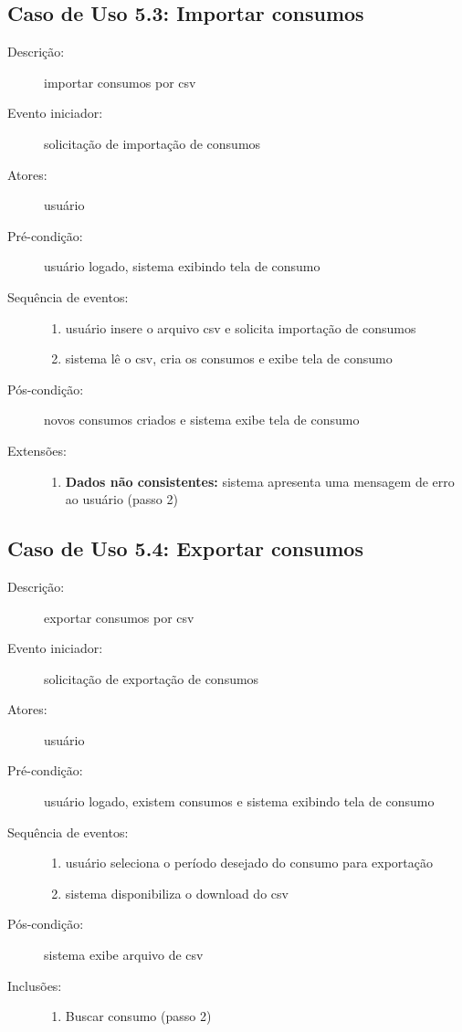 \subsection{Caso de Uso 5.3: Importar consumos}
\begin{description}
	\item[Descrição:] importar consumos por csv
	\item[Evento iniciador:] solicitação de importação de consumos
	\item[Atores:] usuário
	\item[Pré-condição:] usuário logado, sistema exibindo tela de consumo
	\item[Sequência de eventos:] \hfill
		\begin{enumerate}
			\item{usuário insere o arquivo csv e solicita importação de consumos}
			\item{sistema lê o csv, cria os consumos e exibe tela de consumo}
		\end{enumerate}
	\item[Pós-condição:] novos consumos criados e sistema exibe tela de consumo
	\item[Extensões:] \hfill
		\begin{enumerate}
			\item{\textbf{Dados não consistentes:} sistema apresenta uma mensagem de erro ao usuário (passo 2)}
		\end{enumerate}
\end{description}
%
\subsection{Caso de Uso 5.4: Exportar consumos}
\begin{description}
	\item[Descrição:] exportar consumos por csv
	\item[Evento iniciador:] solicitação de exportação de consumos
	\item[Atores:] usuário
	\item[Pré-condição:] usuário logado, existem consumos e sistema exibindo tela de consumo
	\item[Sequência de eventos:] \hfill
		\begin{enumerate}
			\item{usuário seleciona o período desejado do consumo para exportação}
			\item{sistema disponibiliza o download do csv}
		\end{enumerate}
	\item[Pós-condição:] sistema exibe arquivo de csv
	\item[Inclusões:] \hfill
		\begin{enumerate}
			\item{Buscar consumo (passo 2)}
		\end{enumerate}
\end{description}

